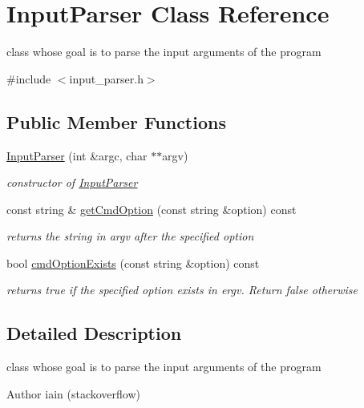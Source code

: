 \hypertarget{class_input_parser}{}\section{Input\+Parser Class Reference}
\label{class_input_parser}


class whose goal is to parse the input arguments of the program  




{\ttfamily \#include $<$input\+\_\+parser.\+h$>$}

\subsection*{Public Member Functions}
\begin{DoxyCompactItemize}
\item 
\mbox{\hyperlink{class_input_parser_af9fa5ead1f28b5294a713410df5b9531}{Input\+Parser}} (int \&argc, char $\ast$$\ast$argv)
\begin{DoxyCompactList}\small\item\em constructor of \mbox{\hyperlink{class_input_parser}{Input\+Parser}} \end{DoxyCompactList}\item 
const string \& \mbox{\hyperlink{class_input_parser_a494c1de8c06fbb5a88343686e36fbf50}{get\+Cmd\+Option}} (const string \&option) const
\begin{DoxyCompactList}\small\item\em returns the string in argv after the specified option \end{DoxyCompactList}\item 
bool \mbox{\hyperlink{class_input_parser_ad3d06a9c59e91f425295bdc8408e0544}{cmd\+Option\+Exists}} (const string \&option) const
\begin{DoxyCompactList}\small\item\em returns true if the specified option exists in ergv. Return false otherwise \end{DoxyCompactList}\end{DoxyCompactItemize}


\subsection{Detailed Description}
class whose goal is to parse the input arguments of the program 

\begin{DoxyAuthor}{Author}
iain (stackoverflow) 
\end{DoxyAuthor}


